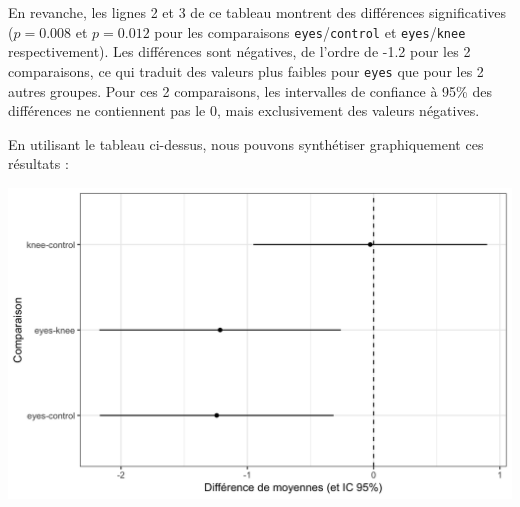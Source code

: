 \documentclass[a4paperpaper,]{article}
\newenvironment{Shaded}{\begin{snugshade}}{\end{snugshade}}
\newcommand{\DataTypeTok}[1]{\textcolor[rgb]{0.00,0.34,0.68}{#1}}
\newcommand{\DecValTok}[1]{\textcolor[rgb]{0.69,0.50,0.00}{#1}}
\newcommand{\KeywordTok}[1]{\textcolor[rgb]{0.12,0.11,0.11}{\textbf{#1}}}
\newcommand{\NormalTok}[1]{\textcolor[rgb]{0.12,0.11,0.11}{#1}}
\newcommand{\OperatorTok}[1]{\textcolor[rgb]{0.12,0.11,0.11}{#1}}
\newcommand{\StringTok}[1]{\textcolor[rgb]{0.75,0.01,0.01}{#1}}
\begin{document}
En revanche, les lignes 2 et 3 de ce tableau montrent des différences significatives (\(p = 0.008\) et \(p = 0.012\) pour les comparaisons \texttt{eyes}/\texttt{control} et \texttt{eyes}/\texttt{knee} respectivement). Les différences sont négatives, de l'ordre de -1.2 pour les 2 comparaisons, ce qui traduit des valeurs plus faibles pour \texttt{eyes} que pour les 2 autres groupes. Pour ces 2 comparaisons, les intervalles de confiance à 95\% des différences ne contiennent pas le 0, mais exclusivement des valeurs négatives.

En utilisant le tableau ci-dessus, nous pouvons synthétiser graphiquement ces résultats :

\begin{Shaded}
\end{Shaded}

\begin{center}\includegraphics[width=0.9\linewidth]{figure/unnamed-chunk-89-1} \end{center}
\end{document}
